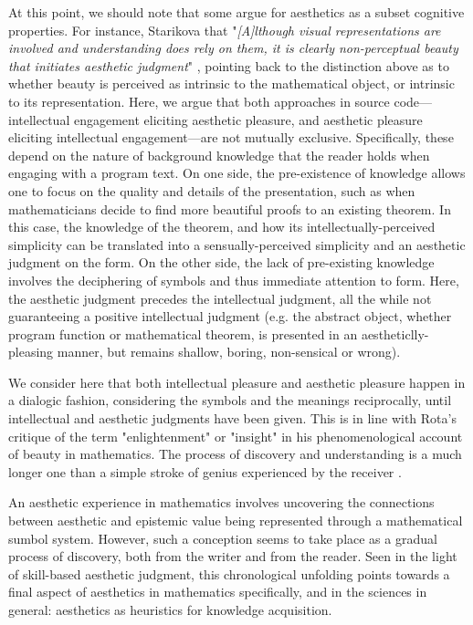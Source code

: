 At this point, we should note that some argue for aesthetics as a subset cognitive properties. For instance, Starikova that "\emph{[A]lthough visual representations are involved and understanding does rely on them, it is clearly non-perceptual beauty that initiates aesthetic judgment}" \citep{starikova_aesthetic_2018}, pointing back to the distinction above as to whether beauty is perceived as intrinsic to the mathematical object, or intrinsic to its representation. Here, we argue that both approaches in source code—intellectual engagement eliciting aesthetic pleasure, and aesthetic pleasure eliciting intellectual engagement—are not mutually exclusive. Specifically, these depend on the nature of background knowledge that the reader holds when engaging with a program text. On one side, the pre-existence of knowledge allows one to focus on the quality and details of the presentation, such as when mathematicians decide to find more beautiful proofs to an existing theorem. In this case, the knowledge of the theorem, and how its intellectually-perceived simplicity can be translated into a sensually-perceived simplicity and an aesthetic judgment on the form. On the other side, the lack of pre-existing knowledge involves the deciphering of symbols and thus immediate attention to form. Here, the aesthetic judgment precedes the intellectual judgment, all the while not guaranteeing a positive intellectual judgment (e.g. the abstract object, whether program function or mathematical theorem, is presented in an aestheticlly-pleasing manner, but remains shallow, boring, non-sensical or wrong).

We consider here that both intellectual pleasure and aesthetic pleasure happen in a dialogic fashion, considering the symbols and the meanings reciprocally, until intellectual and aesthetic judgments have been given. This is in line with Rota's critique of the term "enlightenment" or "insight" in his phenomenological account of beauty in mathematics. The process of discovery and understanding is a much longer one than a simple stroke of genius experienced by the receiver \citep{rota_phenomenology_1997}.

An aesthetic experience in mathematics involves uncovering the connections between aesthetic and epistemic value being represented through a mathematical sumbol system. However, such a conception seems to take place as a gradual process of discovery, both from the writer and from the reader. Seen in the light of skill-based aesthetic judgment, this chronological unfolding points towards a final aspect of aesthetics in mathematics specifically, and in the sciences in general: aesthetics as heuristics for knowledge acquisition.

